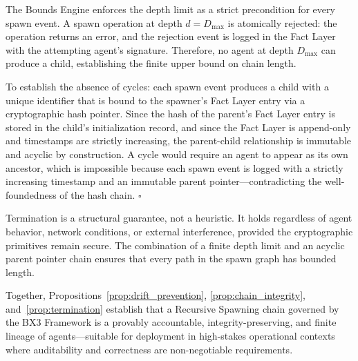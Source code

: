 \begin{Proof}
The Bounds Engine enforces the depth limit as a strict precondition for every spawn event. A spawn operation at depth $d = D_{\max}$ is atomically rejected: the operation returns an error, and the rejection event is logged in the Fact Layer with the attempting agent's signature. Therefore, no agent at depth $D_{\max}$ can produce a child, establishing the finite upper bound on chain length.

To establish the absence of cycles: each spawn event produces a child with a unique identifier that is bound to the spawner's Fact Layer entry via a cryptographic hash pointer. Since the hash of the parent's Fact Layer entry is stored in the child's initialization record, and since the Fact Layer is append-only and timestamps are strictly increasing, the parent-child relationship is immutable and acyclic by construction. A cycle would require an agent to appear as its own ancestor, which is impossible because each spawn event is logged with a strictly increasing timestamp and an immutable parent pointer—contradicting the well-foundedness of the hash chain. $\square$
\end{Proof}

Termination is a structural guarantee, not a heuristic. It holds regardless of agent behavior, network conditions, or external interference, provided the cryptographic primitives remain secure. The combination of a finite depth limit and an acyclic parent pointer chain ensures that every path in the spawn graph has bounded length.

Together, Propositions~\ref{prop:drift_prevention}, \ref{prop:chain_integrity}, and~\ref{prop:termination} establish that a Recursive Spawning chain governed by the BX3 Framework is a provably accountable, integrity-preserving, and finite lineage of agents—suitable for deployment in high-stakes operational contexts where auditability and correctness are non-negotiable requirements.